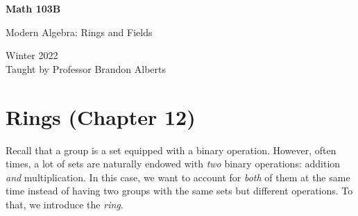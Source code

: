 \documentclass[letterpaper]{article}
\begin{document}
\begin{titlepage}
    \begin{center}
        \vspace*{1cm}
            
        \Huge
        \textbf{Math 103B}
            
        \vspace{0.5cm}
        \LARGE
        Modern Algebra: Rings and Fields
            
        \vspace{1.5cm}
            
        \vfill
            
        Winter 2022 \\
        Taught by Professor Brandon Alberts
    \end{center}
\end{titlepage}


\newpage 

\begingroup
    \renewcommand\contentsname{Table of Contents}
    \tableofcontents
\endgroup

\newpage
{}

\section{Rings (Chapter 12)}
Recall that a group is a set equipped with a binary operation. However, often times, a lot of sets are naturally endowed with \emph{two} binary operations: addition \emph{and} multiplication. In this case, we want to account for \emph{both} of them at the same time instead of having two groups with the same sets but different operations. To that, we introduce the \emph{ring}.
\end{document}
